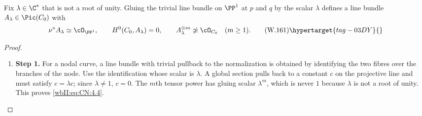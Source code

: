 \begin{lemma}
\hypertarget{tag-03IB}{}\label{wbII:lem:gluing-bundle}

Fix $\lambda\in\C^*$ that is not a root of unity.  Gluing the trivial line
bundle on $\PP^1$ at $p$ and $q$ by the scalar $\lambda$ defines a line bundle
\(A_\lambda\in\Pic(C_0)\) with
\[
 \nu^*A_\lambda\simeq\cO_{\PP^1},\qquad
 H^0(C_0,A_\lambda)=0,\qquad
 A_\lambda^{\otimes m}\not\simeq\cO_{C_0}\quad(m\ge1).
 \tag{W.161}\hypertarget{tag-03DY}{}\label{wbII:eq:CN:4.4}
\]
\end{lemma}



\begin{proof}
\begin{enumerate}[label={$\langle1\rangle$\arabic*.},leftmargin=*]
\item 
\noindent\textbf{Step 1.} For a nodal curve, a line bundle with trivial pullback to the normalization
is obtained by identifying the two fibres over the branches of the node.
Use the identification whose scalar is $\lambda$.  A global section pulls
back to a constant $c$ on the projective line and must satisfy
$c=\lambda c$; since $\lambda\ne1$, $c=0$.  The $m$th tensor power has
gluing scalar $\lambda^m$, which is never $1$ because $\lambda$ is not a
root of unity.  This proves \eqref{wbII:eq:CN:4.4}.

\end{enumerate}
\end{proof}